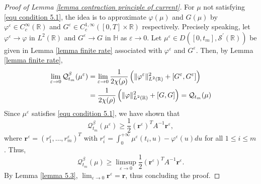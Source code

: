 \documentclass[10pt,a4paper]{amsart}
\newcommand{\R}{\mathbb{R}}
\newcommand{\Scal}{\mathcal{S}}
\begin{document}
\begin{proof}[Proof of Lemma \ref{lemma contraction principle of current}]
	For $\mu$ not satisfying \eqref{equ condition 5.1}, the idea is to approximate $\varphi (\mu)$ and $G (\mu)$ by $\varphi^\varepsilon \in C^\infty_c (\R)$ and $G^{\varepsilon} \in C_c^{1,\infty} ([0,T] \times \R)$ respectively.  Precisely speaking, let  $\varphi^\varepsilon  \rightarrow \varphi$ in $L^2(\R)$ and $G^{\varepsilon}  \rightarrow G$ in $\mathbb{H}$ as $\varepsilon \rightarrow 0$.  Let $\mu^\varepsilon \in D ([0, t_m], \Scal^\prime(\R))$ be given in Lemma \ref{lemma finite rate} associated with $\varphi^\varepsilon $ and $G^{\varepsilon}$. 
	Then, by Lemma \ref{lemma finite rate},
	\begin{align}\label{equ limit in proof of Lemma 5.2}
		\lim_{\varepsilon\rightarrow 0}\mathcal{Q}^\beta_{t_m}(\mu^\varepsilon)&=  \lim_{\varepsilon\rightarrow 0} \frac{1}{2\chi (\rho)} \left(\|\varphi^\varepsilon\|_{L^2(\R)}^2+ [G^{\varepsilon},G^{\varepsilon}]\right) \notag\\
		&=\frac{1}{2\chi (\rho)} \left(\|\varphi\|_{L^2(\R)}^2+ [G,G]\right)=\mathcal{Q}_{t_m}(\mu)
	\end{align}
	Since $\mu^\varepsilon$ satisfies \eqref{equ condition 5.1},  we have shown that
	\[
	\mathcal{Q}^\beta_{t_m} (\mu^\varepsilon)\geq \frac{1}{2} (\mathbf{r}^\varepsilon)^T A^{-1} \mathbf{r}^\varepsilon,
	\]
	where $\mathbf{r}^\varepsilon=(r^\varepsilon_1,\ldots, r^\varepsilon_m)^T$ with $r^\varepsilon_i=\int_0^{+\infty}\mu^\varepsilon(t_i,u)-\varphi^\varepsilon (u) du$ for all $1\leq i\leq m$.  Thus,
	\[\mathcal{Q}_{t_m}^\beta (\mu) \geq    \limsup_{\varepsilon\rightarrow 0} \frac{1}{2} (\mathbf{r}^\varepsilon)^T A^{-1} \mathbf{r}^\varepsilon.\]
By Lemma \ref{lemma 5.3},  $\lim_{\varepsilon \rightarrow 0} \mathbf{r}^\varepsilon = \mathbf{r}$, thus concluding the proof. 
\end{proof}
\end{document}
